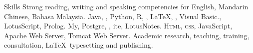 
\begin{rubric}{Skills}
\entry*[Languages]
	Strong reading, writing and speaking competencies for English, Mandarin Chinese, Bahasa Malaysia.
	Java, , Python, R, , \LaTeX, , Visual Basic., LotusScript, Prolog.
\entry*[Databases]
	My, Postgre, , ite, LotusNotes.
	\textsc{Html, css}, JavaScript, Apache Web Server, Tomcat Web Server.
\entry*[Misc.]
	Academic research, teaching, training, consultation, \LaTeX\ typesetting and publishing.
\end{rubric}

